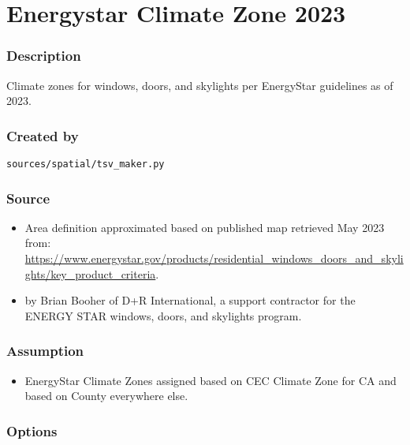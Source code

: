 \section{Energystar Climate Zone
2023}\label{energystar_climate_zone_2023}

\subsubsection{Description}\label{description-40}

Climate zones for windows, doors, and skylights per EnergyStar
guidelines as of 2023.

\subsubsection{Created by}\label{created-by-40}

\texttt{sources/spatial/tsv\_maker.py}

\subsubsection{Source}\label{source-39}

\begin{itemize}
 
\item
  Area definition approximated based on published map retrieved May 2023
  from:
  \url{https://www.energystar.gov/products/residential_windows_doors_and_skylights/key_product_criteria}.
\item
  by Brian Booher of D+R International, a support contractor for the
  ENERGY STAR windows, doors, and skylights program.
\end{itemize}

\subsubsection{Assumption}\label{assumption-21}

\begin{itemize}
 
\item
  EnergyStar Climate Zones assigned based on CEC Climate Zone for CA and
  based on County everywhere else.
\end{itemize}

\subsubsection{Options}\label{options-40}

